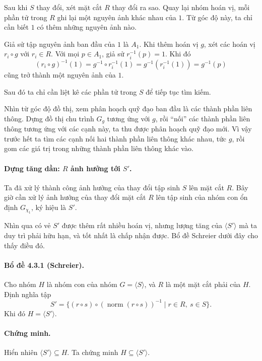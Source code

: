 \documentclass[11pt]{article}
\begin{document}
Sau khi \(S\) thay đổi, xét mặt cắt \(R\) thay đổi ra sao. Quay lại nhóm hoán
vị, mỗi phần tử trong \(R\) ghi lại một nguyên ảnh khác nhau của \(1\). Từ góc
độ này, ta chỉ cần biết \(1\) có thêm những nguyên ảnh nào.

Giả sử tập nguyên ảnh ban đầu của \(1\) là \(A_1\). Khi thêm hoán vị \(g\), xét
các hoán vị \(r_i\circ g\) với \(r_i\in R\). Với mọi \(p\in A_1\), giả sử
\(r_i^{-1}(p)=1\). Khi đó
\[
  (r_i\circ g)^{-1}(1)
  =g^{-1}\circ r_i^{-1}(1)
  =g^{-1}(r_i^{-1}(1))
  =g^{-1}(p)
\]
cũng trở thành một nguyên ảnh của \(1\).

Sau đó ta chỉ cần liệt kê các phần tử trong \(S\) để tiếp tục tìm kiếm.

Nhìn từ góc độ đồ thị, xem phân hoạch quỹ đạo ban đầu là các thành phần liên
thông. Dựng đồ thị chu trình \(G_g\) tương ứng với \(g\), rồi ``nối'' các thành
phần liên thông tương ứng với các cạnh này, ta thu được phân hoạch quỹ đạo mới.
Vì vậy trước hết ta tìm các cạnh nối hai thành phần liên thông khác nhau, tức
\(g\), rồi gom các giá trị trong những thành phần liên thông khác vào.

\paragraph{Dựng tăng dần: \(R\) ảnh hưởng tới \(S'\).}
Ta đã xử lý thành công ảnh hưởng của thay đổi tập sinh \(S\) lên mặt cắt \(R\).
Bây giờ cần xử lý ảnh hưởng của thay đổi mặt cắt \(R\) lên tập sinh của nhóm
con ổn định \(G_{\chi_1}\), ký hiệu là \(S'\).

Nhìn qua có vẻ \(S'\) được thêm rất nhiều hoán vị, nhưng lượng tăng của
\(\langle S'\rangle\) mà ta duy trì phải hữu hạn, và tốt nhất là chấp nhận
được. Bổ đề Schreier dưới đây cho thấy điều đó.

\paragraph{Bổ đề 4.3.1 (Schreier).}
Cho nhóm \(H\) là nhóm con của nhóm \(G=\langle S\rangle\), và \(R\) là một mặt
cắt phải của \(H\). Định nghĩa tập
\[
  S'=\{(r\circ s)\circ(\operatorname{norm}(r\circ s))^{-1}
       \mid r\in R,\ s\in S\}.
\]
Khi đó \(H=\langle S'\rangle\).

\paragraph{Chứng minh.}
Hiển nhiên \(\langle S'\rangle\subseteq H\). Ta chứng minh
\(H\subseteq\langle S'\rangle\).
\end{document}
